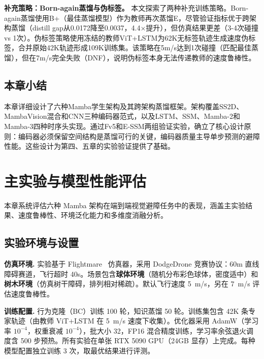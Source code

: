 \documentclass[12pt,a4paper]{article}
\makeatletter
\numberwithin{equation}{section}
\numberwithin{figure}{section}
\numberwithin{table}{section}
\newcommand{\cleardoublepage}{\clearpage\if@twoside\ifodd\c@page\else\hbox{}\thispagestyle{empty}\newpage\if@twocolumn\hbox{}\newpage\fi\fi\fi}%
\makeatother
\begin{document}
\textbf{补充策略：Born-again蒸馏与伪标签。} 本文探索了两种补充训练策略。Born-again蒸馏使用B+（最佳蒸馏模型）作为教师再次蒸馏E，尽管验证指标优于跨架构蒸馏（distill gap从0.0172降至0.0037，4.4$\times$提升），但仿真结果更差（3-4次碰撞 vs 1次）。伪标签策略使用冻结的教师ViT+LSTM为62K无标签轨迹生成速度伪标签，合并原始42K轨迹形成109K训练集。该策略在5m/s达到1次碰撞（匹配最佳蒸馏），但在7m/s完全失败（DNF），说明伪标签本身无法传递教师的速度鲁棒性。

\subsection{本章小结}

本章详细设计了六种Mamba学生架构及其跨架构蒸馏框架。架构覆盖SS2D、MambaVision混合和CNN三种编码器范式，以及LSTM、SSM、Mamba-2和Mamba-3四种时序头实现。通过Fv5和E-SSM两组验证实验，确立了核心设计原则：编码器必须保留空间结构是蒸馏可行的关键，编码器质量主导单步预测的避障性能。这些设计为第四、五章的实验验证提供了基础。

\cleardoublepage
\section{主实验与模型性能评估}
\label{chap:main-results}

本章系统评估六种 Mamba 架构在端到端视觉避障任务中的表现，涵盖主实验结果、速度鲁棒性、环境泛化能力和多维度消融分析。

\subsection{实验环境与设置}
\label{sec:exp-setup}

\textbf{仿真环境.} 实验基于 Flightmare~\cite{shah2017flightmare} 仿真器，采用 DodgeDrone 竞赛协议：60m 直线障碍赛道，飞行超时 40s。场景包含\textbf{球体环境}（随机分布彩色球体，密度适中）和\textbf{树木环境}（仿真树干障碍，排列相对稀疏）。默认飞行速度 5~m/s，另在 7~m/s 评估速度鲁棒性。

\textbf{训练配置.} 行为克隆（BC）训练 100 轮，知识蒸馏 50 轮。训练集包含 42K 条专家轨迹（由教师 ViT+LSTM 在 5~m/s 速度下收集）。优化器采用 AdamW（学习率 $10^{-4}$，权重衰减 $10^{-4}$），批大小 32，FP16 混合精度训练，学习率余弦退火调度含 500 步预热。所有实验在单张 RTX 5090 GPU（24GB 显存）上完成。每种模型配置独立训练 3 次，取最优结果进行评测。
\end{document}
